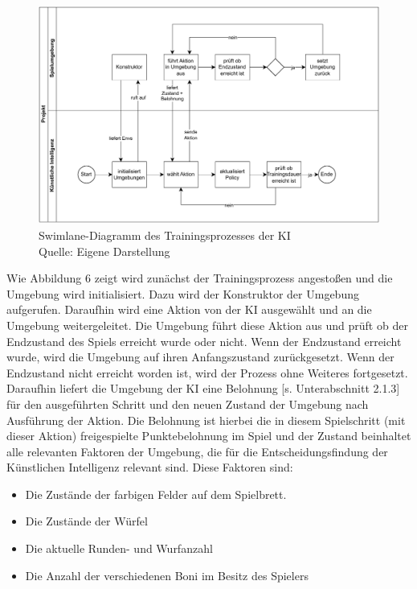 \nopagebreak
\begin{figure}[H]
	\includegraphics[width=1\textwidth]{Bilder/swimlane.drawio.pdf} 
	\caption[Swimlane-Diagramm des Trainingsprozesses der KI]{Swimlane-Diagramm des Trainingsprozesses der KI\\ Quelle: Eigene Darstellung}
\end{figure}	

Wie Abbildung 6 zeigt wird zunächst der Trainingsprozess angestoßen und die Umgebung wird initialisiert. Dazu wird der Konstruktor der Umgebung aufgerufen. Daraufhin wird eine Aktion von der KI ausgewählt und an die Umgebung weitergeleitet. Die Umgebung führt diese Aktion aus und prüft ob der Endzustand des Spiels erreicht wurde oder nicht. Wenn der Endzustand erreicht wurde, wird die Umgebung auf ihren Anfangszustand zurückgesetzt. Wenn der Endzustand nicht erreicht worden ist, wird der Prozess ohne Weiteres fortgesetzt. Daraufhin liefert die Umgebung der KI eine Belohnung [s. Unterabschnitt 2.1.3] für den ausgeführten Schritt und den neuen Zustand der Umgebung nach Ausführung der Aktion. Die Belohnung ist hierbei die in diesem Spielschritt (mit dieser Aktion) freigespielte Punktebelohnung im Spiel und der Zustand beinhaltet alle relevanten Faktoren der Umgebung, die für die Entscheidungsfindung der Künstlichen Intelligenz relevant sind. Diese Faktoren sind:
\begin{itemize} 
\item Die Zustände der farbigen Felder auf dem Spielbrett.
\item Die Zustände der Würfel
\item Die aktuelle Runden- und Wurfanzahl
\item Die Anzahl der verschiedenen Boni im Besitz des Spielers
\end{itemize}


